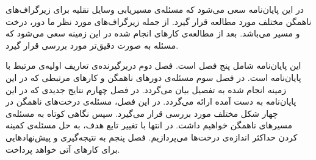 
در این پایان‌نامه سعی می‌شود که مسئله‌ی مسیریابی وسایل نقلیه برای زیرگراف‌های ناهمگن مختلف مورد مطالعه قرار گیرد. از جمله زیرگراف‌های مورد نظر ما دور، درخت و مسیر می‌باشد. بعد از مطالعه‌ی کارهای انجام شده در این زمینه سعی می‌شود که مسئله به صورت دقیق‌تر مورد بررسی قرار گیرد.


این پایان‌نامه شامل پنج فصل است. 
فصل دوم دربرگیرنده‌ی تعاریف اولیه‌ی مرتبط با پایان‌نامه است. 
در فصل سوم مسئله‌ی دورهای ناهمگن و کارهای مرتبطی که در این زمینه انجام شده به تفصیل بیان می‌گردد. 
در فصل چهارم نتایج جدیدی که در این پایان‌نامه به دست آمده ارائه می‌گردد. در این فصل، مسئله‌ی درخت‌های ناهمگن در چهار شکل مختلف مورد بررسی قرار می‌گیرد. سپس نگاهی کوتاه به مسئله‌ی مسیرهای ناهمگن خواهیم داشت. در انتها با تغییر تابع هدف، به حل مسئله‌ی کمینه کردن حداکثر اندازه‌ی درخت‌ها می‌پردازیم.
فصل پنجم به نتیجه‌گیری و پیش‌نهادهایی برای کارهای آتی خواهد پرداخت.
